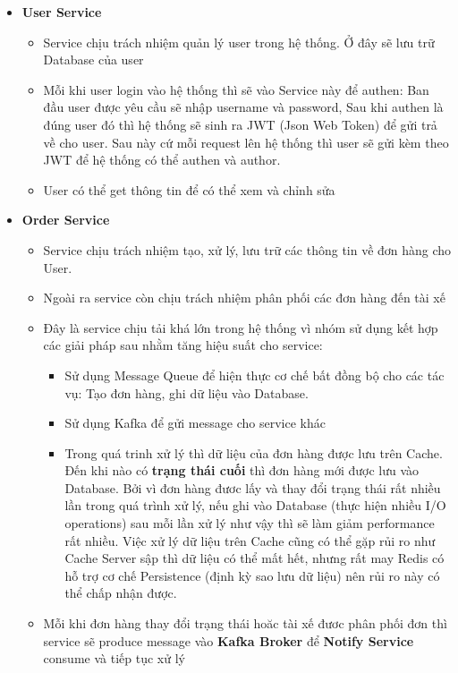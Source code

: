 		
		\begin{itemize}
			\item \textbf{User Service}
			\begin{itemize}
				\item Service chịu trách nhiệm quản lý user trong hệ thống. Ở đây sẽ lưu trữ Database của user
				\item Mỗi khi user login vào hệ thống thì sẽ vào Service này để authen: Ban đầu user được yêu cầu sẽ nhập username và password, Sau khi authen là đúng user đó thì hệ thống sẽ sinh ra JWT (Json Web Token) để gửi trả về cho user. Sau này cứ mỗi request lên hệ thống thì user sẽ gửi kèm theo JWT để hệ thống có thể authen và author.
				\item User có thể get thông tin để có thể xem và chỉnh sửa
			\end{itemize}
			\item \textbf{Order Service}
			\begin{itemize}
				\item Service chịu trách nhiệm tạo, xử lý, lưu trữ các thông tin về đơn hàng cho User.
				\item Ngoài ra service còn chịu trách nhiệm phân phối các đơn hàng đến tài xế
				\item Đây là service chịu tải khá lớn trong hệ thống vì nhóm sử dụng kết hợp các giải pháp sau nhằm tăng hiệu suất cho service: 
					\begin{itemize}
						\item Sử dụng Message Queue để hiện thực cơ chế bất đồng bộ cho các tác vụ: Tạo đơn hàng, ghi dữ liệu vào Database.
						\item Sử dụng Kafka để gửi message cho service khác
						\item Trong quá trinh xử lý thì dữ liệu của đơn hàng được lưu trên Cache. Đến khi nào có \textbf{trạng thái cuối} thì đơn hàng mới được lưu vào Database. Bởi vì đơn hàng đươc lấy và thay đổi trạng thái rất nhiều lần trong quá trình xử lý, nếu ghi vào Database (thực hiện nhiều I/O operations) sau mỗi lần xử lý như vậy thì sẽ làm giảm performance rất nhiều. Việc xử lý dữ liệu trên Cache cũng có thể gặp rủi ro như Cache Server sập thì dữ liệu có thể mất hết, nhưng rất may Redis có hỗ trợ cơ chế Persistence (định kỳ sao lưu dữ liệu) nên rủi ro này có thể chấp nhận được.
					\end{itemize}
				\item Mỗi khi đơn hàng thay đổi trạng thái hoăc tài xế đươc phân phối đơn thì service sẽ produce message vào \textbf{Kafka Broker} để \textbf{Notify Service} consume và tiếp tục xử lý

\end{itemize}
\end{itemize}
